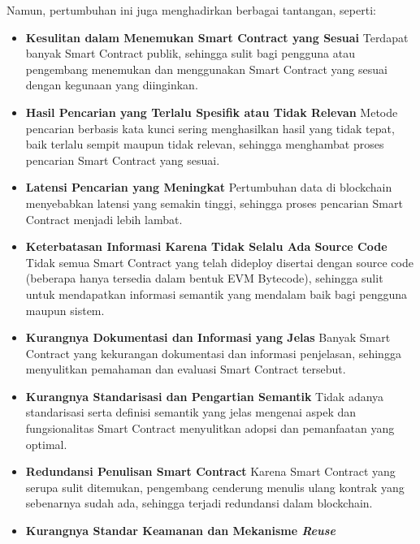 Namun, pertumbuhan ini juga menghadirkan berbagai tantangan, seperti:
\begin{itemize}
    \item \textbf{Kesulitan dalam Menemukan Smart Contract yang Sesuai} \newline
    Terdapat banyak Smart Contract publik, sehingga sulit bagi pengguna atau pengembang menemukan dan menggunakan Smart Contract yang sesuai dengan kegunaan yang diinginkan.
    \item \textbf{Hasil Pencarian yang Terlalu Spesifik atau Tidak Relevan} \newline
    Metode pencarian berbasis kata kunci sering menghasilkan hasil yang tidak tepat, baik terlalu sempit maupun tidak relevan, sehingga menghambat proses pencarian Smart Contract yang sesuai.
    \item \textbf{Latensi Pencarian yang Meningkat} \newline
    Pertumbuhan data di blockchain menyebabkan latensi yang semakin tinggi, sehingga proses pencarian Smart Contract menjadi lebih lambat.
    \item \textbf{Keterbatasan Informasi Karena Tidak Selalu Ada Source Code} \newline
    Tidak semua Smart Contract yang telah dideploy disertai dengan source code (beberapa hanya tersedia dalam bentuk EVM Bytecode), sehingga sulit untuk mendapatkan informasi semantik yang mendalam baik bagi pengguna maupun sistem.
    \item \textbf{Kurangnya Dokumentasi dan Informasi yang Jelas} \newline
    Banyak Smart Contract yang kekurangan dokumentasi dan informasi penjelasan, sehingga menyulitkan pemahaman dan evaluasi Smart Contract tersebut.
    \item \textbf{Kurangnya Standarisasi dan Pengartian Semantik} \newline
    Tidak adanya standarisasi serta definisi semantik yang jelas mengenai aspek dan fungsionalitas Smart Contract menyulitkan adopsi dan pemanfaatan yang optimal.
    \item \textbf{Redundansi Penulisan Smart Contract} \newline
    Karena Smart Contract yang serupa sulit ditemukan, pengembang cenderung menulis ulang kontrak yang sebenarnya sudah ada, sehingga terjadi redundansi dalam blockchain.
    \item \textbf{Kurangnya Standar Keamanan dan Mekanisme \textit{Reuse}} \newline

\end{itemize}
